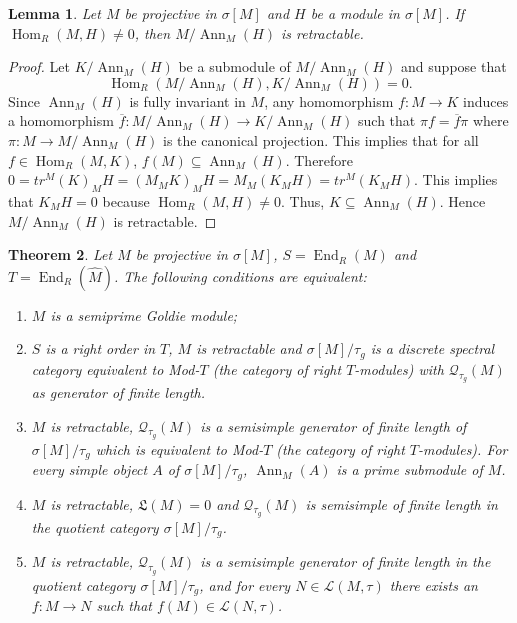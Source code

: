 \documentclass{amsart}
\newtheorem{thm}{Theorem}[section]
\newtheorem{lemma}[thm]{Lemma}
\theoremstyle{definition}
\theoremstyle{remark}
\numberwithin{equation}{section}
\DeclareMathOperator{\Ann}{Ann}
\DeclareMathOperator{\Hom}{Hom}
\DeclareMathOperator{\End}{End}
\newcommand{\sm}{\sigma[M]}
\begin{document}
	\begin{lemma}\label{retfactor}
		Let $M$ be projective in $\sm$ and $H$ be a module in $\sm$. If $\Hom_R(M,H)\neq 0$, then $M/\Ann_M(H)$ is retractable.
	\end{lemma}

	\begin{proof}
		Let $K/\Ann_M(H)$ be a submodule of $M/\Ann_M(H)$ and suppose that 
		\[\Hom_R(M/\Ann_M(H),K/\Ann_M(H))=0.\]
		Since $\Ann_M(H)$ is fully invariant in $M$, any homomorphism $f:M\to K$ induces a homomorphism $\overline{f}:M/\Ann_M(H)\to K/\Ann_M(H)$ such that $\pi f=\overline{f}\pi$ where $\pi:M\to M/\Ann_M(H)$ is the canonical projection. This implies that for all $f\in\Hom_R(M,K)$, $f(M)\subseteq \Ann_M(H)$. Therefore $0=tr^M(K)_MH=(M_MK)_MH=M_M(K_MH)=tr^M(K_MH)$. This implies that $K_MH=0$ because $\Hom_R(M,H)\neq 0$. Thus, $K\subseteq \Ann_M(H)$. Hence $M/\Ann_M(H)$ is retractable.
	\end{proof}

	
	\begin{thm}\label{goldiefl}
		Let $M$ be projective in $\sm$, $S=\End_R(M)$ and $T=\End_R(\widehat{M})$. The following conditions are equivalent:
		\begin{enumerate}[label=\emph{(\alph*)}]
			\item $M$ is a semiprime Goldie module;
			
			\item $S$ is a right order in $T$, $M$ is retractable and $\sm/\tau_g$ is a discrete spectral category equivalent to Mod-$T$ (the category of right $T$-modules) with $\mathcal{Q}_{\tau_g}(M)$ as generator of finite length.
			
			\item $M$ is retractable, $\mathcal{Q}_{\tau_g}(M)$ is a semisimple generator of finite length of  $\sm/\tau_g$ which is  
			equivalent to Mod-$T$ (the category of right $T$-modules). For every simple object $A$ of $\sm/\tau_g$, $\Ann_M(A)$ is a prime submodule of $M$. 
			
			\item $M$ is retractable, $\mathfrak{L}(M)=0$ and $\mathcal{Q}_{\tau_g}(M)$ is semisimple of finite length 
			in the quotient category $\sm/\tau_g$.
			
			\item $M$ is retractable, $\mathcal{Q}_{\tau_g}(M)$ is a semisimple generator of finite length 
			in the quotient category $\sm/\tau_g$, and for every $N\in \mathcal{L}(M,\tau)$ there exists an $f:M\to N$ such that $f(M)\in\mathcal{L}(N,\tau)$.
		\end{enumerate}
	\end{thm}
\end{document}
